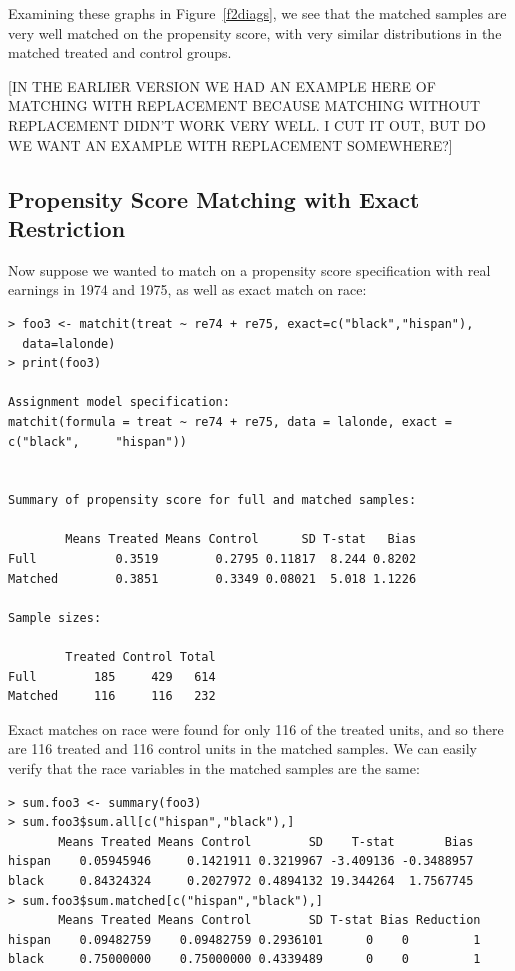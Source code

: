 \documentclass[oneside,letterpaper,titlepage]{article}
\begin{document}
Examining these graphs in Figure~\ref{f2diags}, we see that the
matched samples are very well matched on the propensity score, with
very similar distributions in the matched treated and control groups.

[IN THE EARLIER VERSION WE HAD AN EXAMPLE HERE OF MATCHING WITH
REPLACEMENT BECAUSE MATCHING WITHOUT REPLACEMENT DIDN'T WORK VERY
WELL.  I CUT IT OUT, BUT DO WE WANT AN EXAMPLE WITH REPLACEMENT
SOMEWHERE?]

\subsection{Propensity Score Matching with Exact Restriction}

Now suppose we wanted to match on a propensity score specification
with real earnings in 1974 and 1975, as well as exact match on race:

\begin{verbatim}
> foo3 <- matchit(treat ~ re74 + re75, exact=c("black","hispan"),
  data=lalonde)
> print(foo3)
 
Assignment model specification:
matchit(formula = treat ~ re74 + re75, data = lalonde, exact = c("black",     "hispan"))
 
 
Summary of propensity score for full and matched samples:
 
        Means Treated Means Control      SD T-stat   Bias
Full           0.3519        0.2795 0.11817  8.244 0.8202
Matched        0.3851        0.3349 0.08021  5.018 1.1226
 
Sample sizes:
 
        Treated Control Total
Full        185     429   614
Matched     116     116   232
\end{verbatim}

Exact matches on race were found for only 116 of the treated units,
and so there are 116 treated and 116 control units in the matched
samples.  We can easily verify that the race variables in the matched
samples are the same:

\begin{verbatim}
> sum.foo3 <- summary(foo3)
> sum.foo3$sum.all[c("hispan","black"),]
       Means Treated Means Control        SD    T-stat       Bias
hispan    0.05945946     0.1421911 0.3219967 -3.409136 -0.3488957
black     0.84324324     0.2027972 0.4894132 19.344264  1.7567745
> sum.foo3$sum.matched[c("hispan","black"),]
       Means Treated Means Control        SD T-stat Bias Reduction
hispan    0.09482759    0.09482759 0.2936101      0    0         1
black     0.75000000    0.75000000 0.4339489      0    0         1
\end{verbatim}
\end{document}
